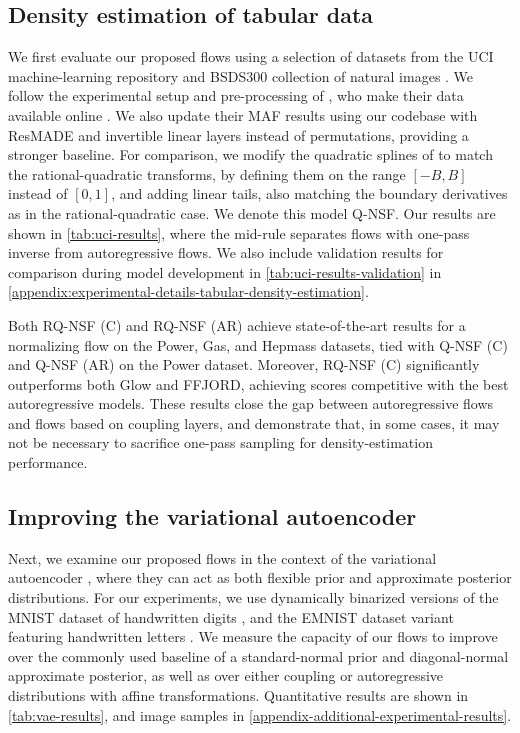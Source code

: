 \subsection{Density estimation of tabular data}
\label{sec:tabular-density-estimation}
We first evaluate our proposed flows using a selection of datasets from the UCI machine-learning repository \cite{dua:2017:uci} and BSDS300 collection of natural images \citep{martin:2001:bsds}. 
We follow the experimental setup and pre-processing of \citet{Papamakarios:2017:maf}, who make their data available online \citep{Papamakarios:2018:maf_datasets}.
We also update their MAF results using our codebase with ResMADE and invertible linear layers instead of permutations, providing a stronger baseline.
For comparison, we modify the quadratic splines of \citet{Muller:2018:nis} to match the rational-quadratic transforms, by defining them on the range $ [-B, B] $ instead of $ [0, 1] $, and adding linear tails, also matching the boundary derivatives as in the rational-quadratic case. 
We denote this model Q-NSF\@. 
Our results are shown in \cref{tab:uci-results}, where the mid-rule separates flows with one-pass inverse from autoregressive flows.
We also include validation results for comparison during model development in \cref{tab:uci-results-validation} in \cref{appendix:experimental-details-tabular-density-estimation}.

Both RQ-NSF (C) and RQ-NSF (AR) achieve state-of-the-art results for a normalizing flow on the Power, Gas, and Hepmass datasets, tied with Q-NSF (C) and Q-NSF (AR) on the Power dataset. 
Moreover, RQ-NSF (C) significantly outperforms both Glow and FFJORD, achieving scores competitive with the best autoregressive models. 
These results close the gap between autoregressive flows and flows based on coupling layers, and demonstrate that, in some cases, it may not be necessary to sacrifice one-pass sampling for density-estimation performance.


\subsection{Improving the variational autoencoder}
\label{sec:vae}

Next, we examine our proposed flows in the context of the variational autoencoder \citep[VAE,][]{Kingma:2014:vae, Rezende:2014:vae}, where they can act as both flexible prior and approximate posterior distributions. 
For our experiments, we use dynamically binarized versions of the MNIST dataset of handwritten digits \citep{lecun:1998:mnist}, and the EMNIST dataset variant featuring handwritten letters \citep{cohen2017emnist}.
We measure the capacity of our flows to improve over the commonly used baseline of a standard-normal prior and diagonal-normal approximate posterior, as well as over either coupling or autoregressive distributions with affine transformations.
Quantitative results are shown in \cref{tab:vae-results}, and image samples
in \cref{appendix-additional-experimental-results}.

